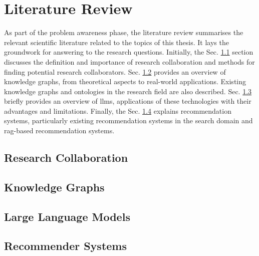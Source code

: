 \chapter{Literature Review}\label{chap:literature-review}

As part of the problem awareness phase, the literature review summarises the relevant scientific literature related to the topics of this thesis.
It lays the groundwork for answering to the research questions.
Initially, the Sec. \ref{sec:research-collaboration} section discusses the definition and importance of research collaboration and methods for finding potential research collaborators.
Sec. \ref{sec:knowledge-graphs} provides an overview of knowledge graphs, from theoretical aspects to real-world applications.
Existing knowledge graphs and ontologies in the research field are also described.
Sec. \ref{sec:large-language-models} briefly provides an overview of \glspl{llm}, applications of these technologies with their advantages and limitations.
Finally, the Sec. \ref{sec:recommender-systems} explains recommendation systems, particularly existing recommendation systems in the search domain and \gls{rag}-based recommendation systems.
%
\section{Research Collaboration}\label{sec:research-collaboration}

%
\section{Knowledge Graphs}\label{sec:knowledge-graphs}

%
\section{Large Language Models}\label{sec:large-language-models}

%
\section{Recommender Systems}\label{sec:recommender-systems}

%
%
%